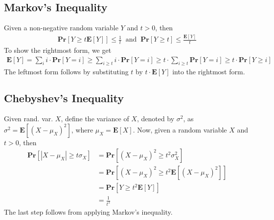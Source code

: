\documentclass[12pt]{article}
\begin{document}
\subsection{Markov's Inequality}
Given a non-negative random variable $Y$ and $t > 0$, then
\begin{align*}
\mathbf{Pr}\left[ Y \geq t \mathbf{E}\left[ Y \right] \right] \leq \frac{1}{t} \;\; \mathrm{ and } \;\; \mathbf{Pr}\left[ Y \geq t \right] \leq \frac{\mathbf{E}\left[ Y \right]}{t}
\end{align*}
To show the rightmost form, we get
\begin{align*}
\mathbf{E}\left[ Y \right] = \sum_{i} i \cdot \mathbf{Pr}\left[ Y=i \right] \geq \sum_{i \geq t} i \cdot \mathbf{Pr}\left[ Y=i \right] \geq t \cdot \sum_{i \geq t} \mathbf{Pr}\left[ Y=i \right] \geq t \cdot \mathbf{Pr}\left[ Y \geq i \right] 
\end{align*}
The leftmost form follows by substituting $t$ by $t \cdot \mathbf{E}\left[ Y \right]$ into the rightmost form.

\subsection{Chebyshev's Inequality}
Given rand. var. $X$, define the variance of $X$, denoted by $\sigma^2$, as $\sigma^2 = \mathbf{E}\left[ \left( X - \mu_X \right)^2 \right]$, where $\mu_X = \mathbf{E} \left[ X \right]$. Now, given a random variable $X$ and $t > 0$, then
\begin{align*}
\mathbf{Pr}\left[ \left| X-\mu_X \right| \geq t\sigma_X \right] &= \mathbf{Pr}\left[ \left( X-\mu_X \right)^2 \geq t^2\sigma_X^2 \right] \\
&= \mathbf{Pr}\left[ \left( X-\mu_X \right)^2 \geq t^2 \mathbf{E}\left[\left( X-\mu_X \right)^2\right] \right] \\
&= \mathbf{Pr}\left[ Y \geq t^2\mathbf{E}\left[Y\right] \right] \\
&= \frac{1}{t^2}
\end{align*}
The last step follows from applying Markov's inequality.
\end{document}
